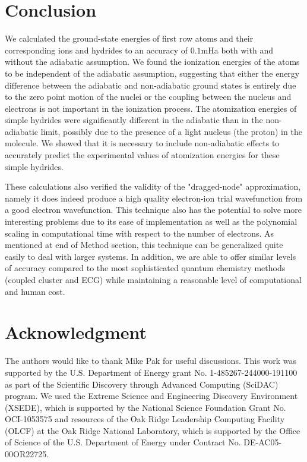 \documentclass[aps,prl,superscriptaddress,groupedaddress]{revtex4}
\begin{document}
\section{Conclusion}
We calculated the ground-state energies of first row atoms and their corresponding ions and hydrides to an accuracy of $0.1$mHa both with and without the adiabatic assumption. We found the ionization energies of the atoms to be independent of the adiabatic assumption, suggesting that either the energy difference between the adiabatic and non-adiabatic ground states is entirely due to the zero point motion of the nuclei or the coupling between the nucleus and electrons is not important in the ionization process. The atomization energies of simple hydrides were significantly different in the adiabatic than in the non-adiabatic limit, possibly due to the presence of a light nucleus (the proton) in the molecule. We showed that it is necessary to include non-adiabatic effects to accurately predict the experimental values of atomization energies for these simple hydrides.

These calculations also verified the validity of the "dragged-node" approximation, namely it does indeed produce a high quality electron-ion trial wavefunction from a good electron wavefunction. This technique also has the potential to solve more interesting problems due to its ease of implementation as well as the polynomial scaling in computational time with respect to the number of electrons. As mentioned at end of Method section, this technique can be generalized quite easily to deal with larger systems. In addition, we are able to offer similar levels of accuracy compared to the most sophisticated quantum chemistry methods (coupled cluster and ECG) while maintaining a reasonable level of computational and human cost.

\section{Acknowledgment}
The authors would like to thank Mike Pak for useful discussions. This work was supported by the U.S. Department of Energy grant No. 1-485267-244000-191100 as part of the Scientific Discovery through Advanced Computing (SciDAC) program. We used the Extreme Science and Engineering Discovery Environment (XSEDE), which is supported by the National Science Foundation Grant No. OCI-1053575 and resources of the Oak Ridge Leadership Computing Facility (OLCF) at the Oak Ridge National Laboratory, which is supported by the Office of Science of the U.S. Department of Energy under Contract No. DE-AC05-00OR22725.

\pagebreak


\end{document}
